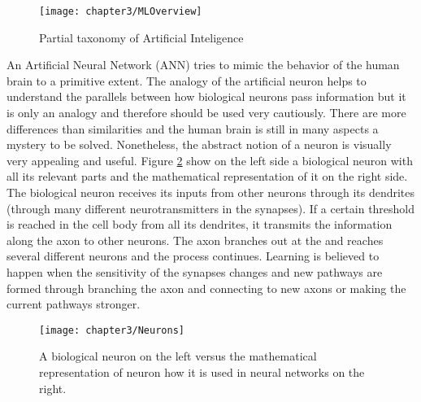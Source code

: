 \begin{figure}[H]
  \centering
  \caption{Partial taxonomy of Artificial Inteligence \cite{alom2018history}}
  \texttt{[image: chapter3/MLOverview]}
  \label{fig:MLOverview}
\end{figure}

An Artificial Neural Network (ANN) tries to mimic the behavior of the human brain to a primitive extent. The analogy of the artificial neuron helps to understand the parallels between how biological neurons pass information but it is only an analogy and therefore should be used very cautiously. There are more differences than similarities and the human brain is still in many aspects a mystery to be solved. Nonetheless, the abstract notion of a neuron is visually very appealing and useful. Figure \ref{fig:Neurons} show on the left side a biological neuron with all its relevant parts and the mathematical representation of it on the right side. The biological neuron receives its inputs from other neurons through its dendrites (through many different neurotransmitters in the synapses). If a certain threshold is reached in the cell body from all its dendrites, it transmits the information along the axon to other neurons. The axon branches out at the and reaches several different neurons and the process continues. Learning is believed to happen when the sensitivity of the synapses changes and new pathways are formed through branching the axon and connecting to new axons or making the current pathways stronger.

\begin{figure}[H]
  \centering
  \caption{A biological neuron on the left versus the mathematical representation of neuron how it is used in neural networks on the right. \cite{cs231neuralnetworks}}
  \texttt{[image: chapter3/Neurons]}
  \label{fig:Neurons}
\end{figure}


